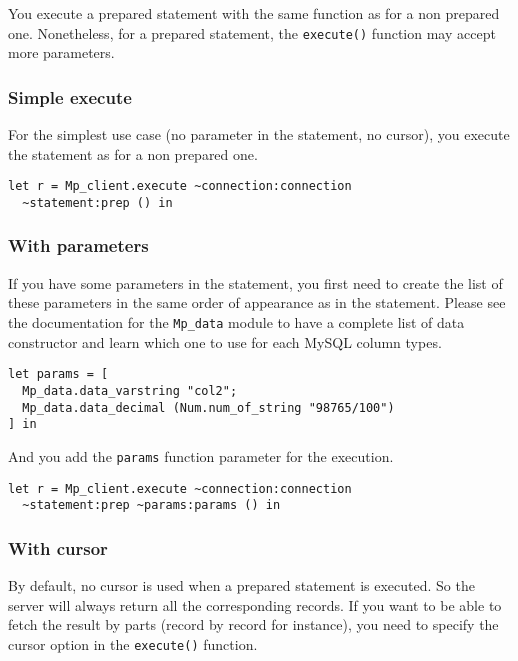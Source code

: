 \documentclass[a4paper, english, 11pt]{article}
\begin{document}
You execute a prepared statement with the same function as for a non prepared one. Nonetheless, for a prepared statement, the \texttt{execute()} function may accept more parameters.

\subsubsection{Simple execute}

For the simplest use case (no parameter in the statement, no cursor), you execute the statement as for a non prepared one.

\begin{verbatim}
let r = Mp_client.execute ~connection:connection
  ~statement:prep () in
\end{verbatim}

\subsubsection{With parameters}

If you have some parameters in the statement, you first need to create the list of these parameters in the same order of appearance as in the statement. Please see the documentation for the \texttt{Mp\_data} module to have a complete list of data constructor and learn which one to use for each MySQL column types.

\begin{verbatim}
let params = [
  Mp_data.data_varstring "col2";
  Mp_data.data_decimal (Num.num_of_string "98765/100")
] in
\end{verbatim}

And you add the \texttt{params} function parameter for the execution.

\begin{verbatim}
let r = Mp_client.execute ~connection:connection
  ~statement:prep ~params:params () in
\end{verbatim}

\subsubsection{With cursor}

By default, no cursor is used when a prepared statement is executed. So the server will always return all the corresponding records. If you want to be able to fetch the result by parts (record by record for instance), you need to specify the cursor option in the \texttt{execute()} function.
\end{document}
